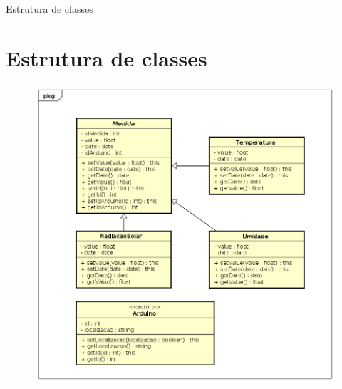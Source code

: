 \documentclass[aspectratio=43]{beamer}
\begin{document}
\begin{frame}{Estrutura de classes}
\section{Estrutura de classes}
    \begin{figure}[H]
        \label{figure_diagrama_classe}
        \centering
        \includegraphics[scale=0.28]{classe.png}
        \hfill
    \end{figure}
\end{frame}
\end{document}
